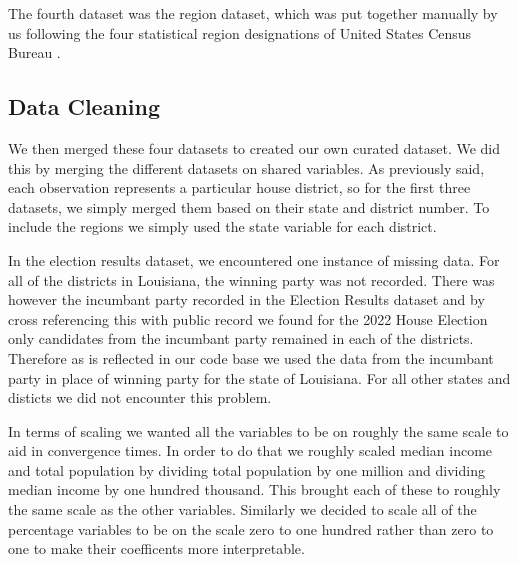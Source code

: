 \documentclass[12pt]{article}
\begin{document}
The fourth dataset was the region dataset, which was put together manually by us following the four statistical region designations of United States Census Bureau \parencite{regions}. 


\subsection*{Data Cleaning}

We then merged these four datasets to created our own curated dataset. We did this by merging the different datasets on shared variables. As previously said, each observation represents a particular house district, so for the first three datasets, we simply merged them based on their state and district number. To include the regions we simply used the state variable for each district. 


In the election results dataset, we encountered one instance of missing data. For all of the districts in Louisiana, the winning party was not recorded. There was however the incumbant party recorded  in the Election Results dataset and by cross referencing this with public record we found for the 2022 House Election only candidates from the incumbant party remained in each of the districts. Therefore as is reflected in our code base we used the data from the incumbant party in place of winning party for the state of Louisiana. For all other states and disticts we did not encounter this problem. 

In terms of scaling we wanted all the variables to be on roughly the same scale to aid in convergence times. In order to do that we roughly scaled median income and total population by dividing total population by one million and dividing median income by one hundred thousand. This brought each of these to roughly the same scale as the other variables. Similarly we decided to scale all of the percentage variables to be on the scale zero to one hundred rather than zero to one to make their coefficents more interpretable.  

\end{document}

